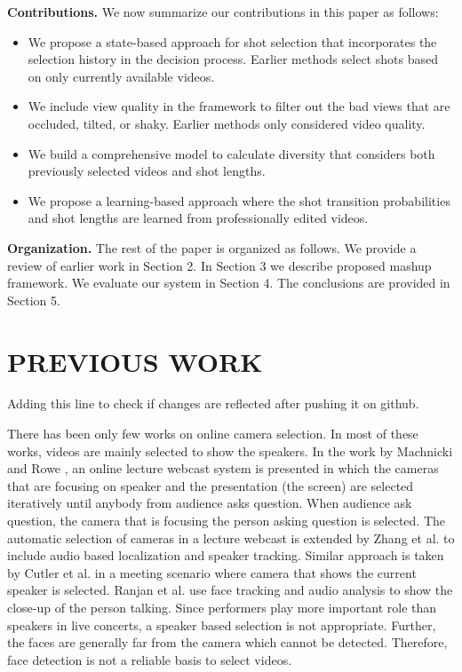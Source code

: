 \documentclass{sig-alternate}
\begin{document}
\textbf{Contributions.} We now summarize our contributions in this paper
as follows:

\begin{itemize}
    \item We propose a state-based approach for shot selection that incorporates
the selection history in the decision process. Earlier methods select shots based on only currently available
videos.
    \item  We include view quality in the framework to filter out the
bad views that are occluded, tilted, or shaky. Earlier methods
only considered video quality.
    \item We build a comprehensive model to calculate diversity that
considers both previously selected videos and shot lengths.
    \item We propose a learning-based approach where the shot transition
probabilities and shot lengths are learned from professionally
edited videos.
\end{itemize}

\textbf{Organization.} The rest of the paper is organized as follows.
We provide a review of earlier work in Section 2. In Section 3 we
describe proposed mashup framework. We evaluate our system in
Section 4. The conclusions are provided in Section 5.


\section{PREVIOUS WORK}

Adding this line to check if changes are reflected after pushing it on github.

There has been only few works on online camera selection. In
most of these works, videos are mainly selected to show the speakers.
In the work by Machnicki and Rowe \cite{saini2012movimash}, an online lecture
webcast system is presented in which the cameras that are focusing
on speaker and the presentation (the screen) are selected iteratively
until anybody from audience asks question. When audience ask
question, the camera that is focusing the person asking question is
selected. The automatic selection of cameras in a lecture webcast
is extended by Zhang et al. \cite{saini2012movimash} to include audio based localization
and speaker tracking. Similar approach is taken by Cutler et al. \cite{saini2012movimash}
in a meeting scenario where camera that shows the current speaker
is selected. Ranjan et al. \cite{saini2012movimash} use face tracking and audio analysis
to show the close-up of the person talking. Since performers
play more important role than speakers in live concerts, a speaker
based selection is not appropriate. Further, the faces are generally
far from the camera which cannot be detected. Therefore, face detection
is not a reliable basis to select videos.
\end{document}

